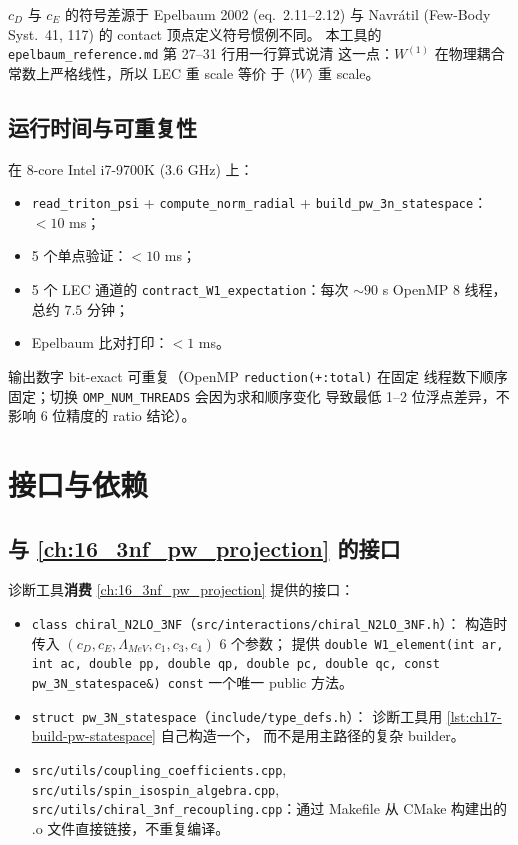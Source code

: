 \(c_D\) 与 \(c_E\) 的符号差源于 Epelbaum 2002 (eq.~2.11--2.12) 与
Navrátil (Few-Body Syst.~41, 117) 的 contact 顶点定义符号惯例不同。
本工具的 \texttt{epelbaum\_reference.md} 第 27--31 行用一行算式说清
这一点：\(W^{(1)}\) 在物理耦合常数上严格线性，所以 LEC 重 scale 等价
于 \(\langle W\rangle\) 重 scale。

\subsection{运行时间与可重复性}
\label{subsec:ch17-runtime}

在 8-core Intel i7-9700K (3.6 GHz) 上：

\begin{itemize}
  \item \texttt{read\_triton\_psi} + \texttt{compute\_norm\_radial} +
        \texttt{build\_pw\_3n\_statespace}：\(<10\) ms；
  \item 5 个单点验证：\(<10\) ms；
  \item 5 个 LEC 通道的 \texttt{contract\_W1\_expectation}：每次 \(\sim 90\) s
        OpenMP 8 线程，总约 \(7.5\) 分钟；
  \item Epelbaum 比对打印：\(<1\) ms。
\end{itemize}

输出数字 bit-exact 可重复（OpenMP \texttt{reduction(+:total)} 在固定
线程数下顺序固定；切换 \texttt{OMP\_NUM\_THREADS} 会因为求和顺序变化
导致最低 1--2 位浮点差异，不影响 \(6\) 位精度的 ratio 结论）。

\section{接口与依赖}
\label{sec:ch17-interfaces}

\subsection{与 \cref{ch:16_3nf_pw_projection} 的接口}
\label{subsec:ch17-iface-ch16}

诊断工具\textbf{消费} \cref{ch:16_3nf_pw_projection} 提供的接口：

\begin{itemize}
  \item \texttt{class chiral\_N2LO\_3NF}（\texttt{src/interactions/chiral\_N2LO\_3NF.h}）：
        构造时传入 \((c_D, c_E, \Lambda_{MeV}, c_1, c_3, c_4)\) 6 个参数；
        提供 \texttt{double W1\_element(int ar, int ac, double pp, double qp,
        double pc, double qc, const pw\_3N\_statespace\&) const} 一个唯一
        public 方法。
  \item \texttt{struct pw\_3N\_statespace}（\texttt{include/type\_defs.h}）：
        诊断工具用 \cref{lst:ch17-build-pw-statespace} 自己构造一个，
        而不是用主路径的复杂 builder。
  \item \texttt{src/utils/coupling\_coefficients.cpp},
        \texttt{src/utils/spin\_isospin\_algebra.cpp},
        \texttt{src/utils/chiral\_3nf\_recoupling.cpp}：通过 Makefile
        从 CMake 构建出的 .o 文件直接链接，不重复编译。
\end{itemize}

